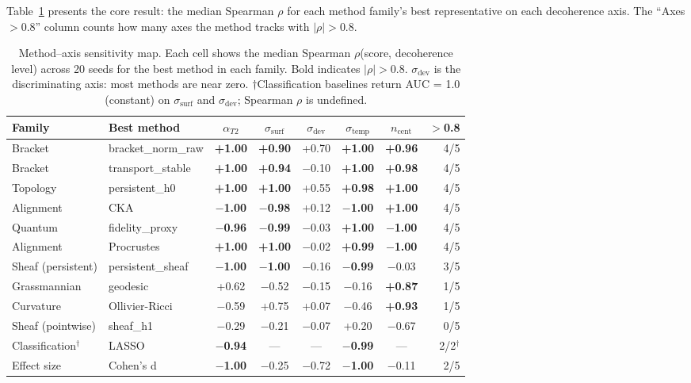 \documentclass[11pt]{article}
\begin{document}
Table~\ref{tab:sensitivity} presents the core result: the median
Spearman $\rho$ for each method family's best representative on each
decoherence axis.  The ``Axes $> 0.8$'' column counts how many axes
the method tracks with $|\rho| > 0.8$.

\begin{table}[t]
\centering
\caption{Method--axis sensitivity map.  Each cell shows the median
  Spearman $\rho$(score, decoherence level) across 20 seeds for the
  best method in each family.  Bold indicates $|\rho| > 0.8$.
  $\sigma_\text{dev}$ is the discriminating axis: most methods are near
  zero.  $\dagger$Classification baselines return AUC = 1.0 (constant)
  on $\sigma_\text{surf}$ and $\sigma_\text{dev}$; Spearman $\rho$ is
  undefined.}
\label{tab:sensitivity}
\small
\begin{tabular}{@{}llcccccr@{}}
\toprule
Family & Best method & $\alpha_{T2}$ & $\sigma_\text{surf}$ & $\sigma_\text{dev}$ & $\sigma_\text{temp}$ & $n_\text{cent}$ & $>$0.8 \\
\midrule
Bracket & bracket\_norm\_raw & \textbf{+1.00} & \textbf{+0.90} & +0.70 & \textbf{+1.00} & \textbf{+0.96} & 4/5 \\
Bracket & transport\_stable & \textbf{+1.00} & \textbf{+0.94} & $-$0.10 & \textbf{+1.00} & \textbf{+0.98} & 4/5 \\
Topology & persistent\_h0 & \textbf{+1.00} & \textbf{+1.00} & +0.55 & \textbf{+0.98} & \textbf{+1.00} & 4/5 \\
Alignment & CKA & \textbf{$-$1.00} & \textbf{$-$0.98} & +0.12 & \textbf{$-$1.00} & \textbf{+1.00} & 4/5 \\
Quantum & fidelity\_proxy & \textbf{$-$0.96} & \textbf{$-$0.99} & $-$0.03 & \textbf{+1.00} & \textbf{$-$1.00} & 4/5 \\
Alignment & Procrustes & \textbf{+1.00} & \textbf{+1.00} & $-$0.02 & \textbf{+0.99} & \textbf{$-$1.00} & 4/5 \\
Sheaf (persistent) & persistent\_sheaf & \textbf{$-$1.00} & \textbf{$-$1.00} & $-$0.16 & \textbf{$-$0.99} & $-$0.03 & 3/5 \\
\midrule
Grassmannian & geodesic & +0.62 & $-$0.52 & $-$0.15 & $-$0.16 & \textbf{+0.87} & 1/5 \\
Curvature & Ollivier-Ricci & $-$0.59 & +0.75 & +0.07 & $-$0.46 & \textbf{+0.93} & 1/5 \\
Sheaf (pointwise) & sheaf\_h1 & $-$0.29 & $-$0.21 & $-$0.07 & +0.20 & $-$0.67 & 0/5 \\
\midrule
Classification$^\dagger$ & LASSO & \textbf{$-$0.94} & --- & --- & \textbf{$-$0.99} & --- & 2/2$^\dagger$ \\
Effect size & Cohen's d & \textbf{$-$1.00} & $-$0.25 & $-$0.72 & \textbf{$-$1.00} & $-$0.11 & 2/5 \\
\bottomrule
\end{tabular}
\end{table}
\end{document}

